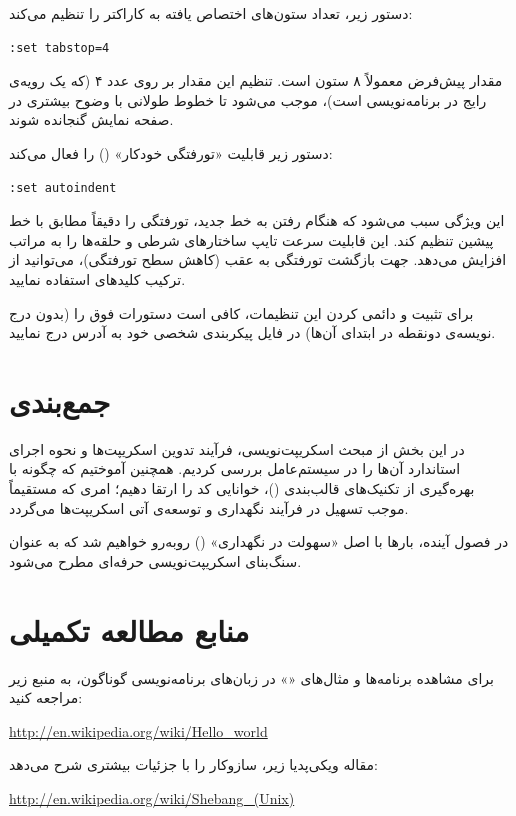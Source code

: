 دستور زیر، تعداد ستون‌های اختصاص یافته به کاراکتر  را تنظیم می‌کند:

\begin{latin}
\begin{lstlisting}
:set tabstop=4
\end{lstlisting}
\end{latin}

مقدار پیش‌فرض معمولاً ۸ ستون است. تنظیم این مقدار بر روی عدد ۴ (که یک رویه‌ی رایج در برنامه‌نویسی است)، موجب می‌شود تا خطوط طولانی با وضوح بیشتری در صفحه نمایش گنجانده شوند.

دستور زیر قابلیت «تورفتگی خودکار» () را فعال می‌کند:

\begin{latin}
\begin{lstlisting}
:set autoindent
\end{lstlisting}
\end{latin}

این ویژگی سبب می‌شود که  هنگام رفتن به خط جدید، تورفتگی را دقیقاً مطابق با خط پیشین تنظیم کند. این قابلیت سرعت تایپ ساختارهای شرطی و حلقه‌ها را به مراتب افزایش می‌دهد. جهت بازگشت تورفتگی به عقب (کاهش سطح تورفتگی)، می‌توانید از ترکیب کلیدهای  استفاده نمایید.

برای تثبیت و دائمی کردن این تنظیمات، کافی است دستورات فوق را (بدون درج نویسه‌ی دونقطه در ابتدای آن‌ها) در فایل پیکربندی شخصی خود به آدرس  درج نمایید.

\section{جمع‌بندی}

در این بخش از مبحث اسکریپت‌نویسی، فرآیند تدوین اسکریپت‌ها و نحوه اجرای استاندارد آن‌ها را در سیستم‌عامل بررسی کردیم. همچنین آموختیم که چگونه با بهره‌گیری از تکنیک‌های قالب‌بندی ()، خوانایی کد را ارتقا دهیم؛ امری که مستقیماً موجب تسهیل در فرآیند نگهداری و توسعه‌ی آتی اسکریپت‌ها می‌گردد.

در فصول آینده، بارها با اصل «سهولت در نگهداری» () روبه‌رو خواهیم شد که به عنوان سنگ‌بنای اسکریپت‌نویسی حرفه‌ای مطرح می‌شود.

\section{منابع مطالعه تکمیلی}

برای مشاهده برنامه‌ها و مثال‌های «» در زبان‌های برنامه‌نویسی گوناگون، به منبع زیر مراجعه کنید:

\begin{latin}
\url{http://en.wikipedia.org/wiki/Hello_world}
\end{latin}

مقاله ویکی‌پدیا زیر، سازوکار  را با جزئیات بیشتری شرح می‌دهد:

\begin{latin}
\url{http://en.wikipedia.org/wiki/Shebang_(Unix)}
\end{latin}